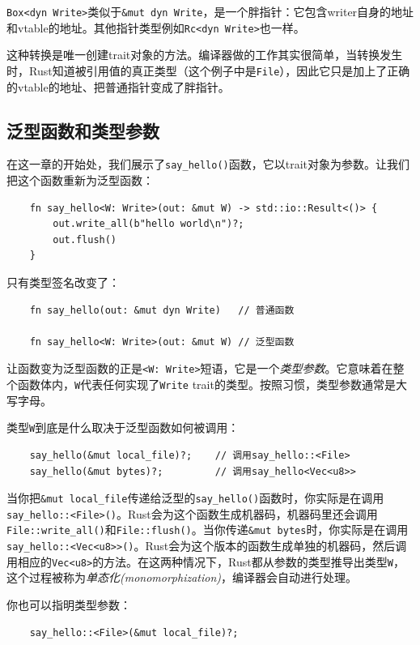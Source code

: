 \texttt{Box<dyn Write>}类似于\texttt{\&mut dyn Write}，是一个胖指针：它包含writer自身的地址和vtable的地址。其他指针类型例如\texttt{Rc<dyn Write>}也一样。

这种转换是唯一创建trait对象的方法。编译器做的工作其实很简单，当转换发生时，Rust知道被引用值的真正类型（这个例子中是\texttt{File}），因此它只是加上了正确的vtable的地址、把普通指针变成了胖指针。

\subsection{泛型函数和类型参数}
在这一章的开始处，我们展示了\texttt{say\_hello()}函数，它以trait对象为参数。让我们把这个函数重新为泛型函数：
\begin{verbatim}
    fn say_hello<W: Write>(out: &mut W) -> std::io::Result<()> {
        out.write_all(b"hello world\n")?;
        out.flush()
    }
\end{verbatim}

只有类型签名改变了：
\begin{verbatim}
    fn say_hello(out: &mut dyn Write)   // 普通函数

    fn say_hello<W: Write>(out: &mut W) // 泛型函数
\end{verbatim}

让函数变为泛型函数的正是\texttt{<W: Write>}短语，它是一个\emph{类型参数}。它意味着在整个函数体内，\texttt{W}代表任何实现了\texttt{Write} trait的类型。按照习惯，类型参数通常是大写字母。

类型\texttt{W}到底是什么取决于泛型函数如何被调用：
\begin{verbatim}
    say_hello(&mut local_file)?;    // 调用say_hello::<File>
    say_hello(&mut bytes)?;         // 调用say_hello<Vec<u8>>
\end{verbatim}

当你把\texttt{\&mut local\_file}传递给泛型的\texttt{say\_hello()}函数时，你实际是在调用\texttt{say\_hello::<File>()}。Rust会为这个函数生成机器码，机器码里还会调用\texttt{File::write\_all()}和\texttt{File::flush()}。当你传递\texttt{\&mut bytes}时，你实际是在调用\texttt{say\_hello::<Vec<u8>>()}。Rust会为这个版本的函数生成单独的机器码，然后调用相应的\texttt{Vec<u8>}的方法。在这两种情况下，Rust都从参数的类型推导出类型\texttt{W}，这个过程被称为\emph{单态化(monomorphization)}，编译器会自动进行处理。

你也可以指明类型参数：
\begin{verbatim}
    say_hello::<File>(&mut local_file)?;
\end{verbatim}

